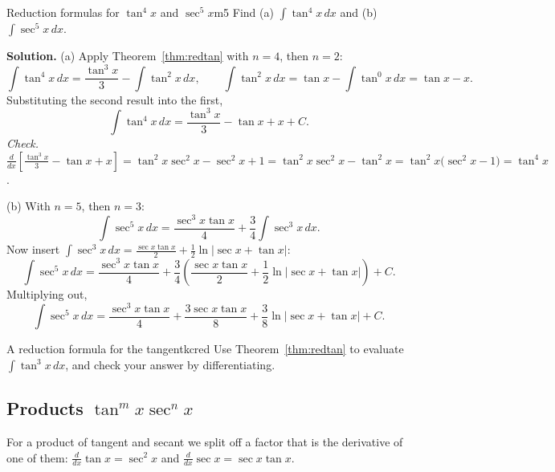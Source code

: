 \documentclass[11pt]{article}
\begin{document}
\begin{exmp}{Reduction formulas for $\tan^4x$ and $\sec^5x$}{m5}
Find (a) $\int\tan^4x\,dx$ and (b) $\int\sec^5x\,dx$.

\textbf{Solution.} (a) Apply Theorem~\ref{thm:redtan} with $n=4$, then $n=2$:
\[\int\tan^4x\,dx=\frac{\tan^3x}3-\int\tan^2x\,dx,\qquad\int\tan^2x\,dx=\tan x-\int\tan^0x\,dx=\tan x-x .\]
Substituting the second result into the first,
\[\int\tan^4x\,dx=\frac{\tan^3x}3-\tan x+x+C .\]
\emph{Check.} $\frac{d}{dx}\left[\frac{\tan^3x}3-\tan x+x\right]=\tan^2x\sec^2x-\sec^2x+1=\tan^2x\sec^2x-\tan^2x=\tan^2x\big(\sec^2x-1\big)=\tan^4x$.

(b) With $n=5$, then $n=3$:
\[\int\sec^5x\,dx=\frac{\sec^3x\tan x}4+\frac34\int\sec^3x\,dx .\]
Now insert $\int\sec^3x\,dx=\frac{\sec x\tan x}2+\frac12\ln\lvert\sec x+\tan x\rvert$:
\[\int\sec^5x\,dx=\frac{\sec^3x\tan x}4+\frac34\left(\frac{\sec x\tan x}2+\frac12\ln\lvert\sec x+\tan x\rvert\right)+C .\]
Multiplying out,
\[\int\sec^5x\,dx=\frac{\sec^3x\tan x}4+\frac{3\sec x\tan x}8+\frac38\ln\lvert\sec x+\tan x\rvert+C .\]
\end{exmp}

\begin{kc}{A reduction formula for the tangent}{kcred}
Use Theorem~\ref{thm:redtan} to evaluate $\int\tan^3x\,dx$, and check your answer by differentiating.
\end{kc}

\subsection*{Products $\tan^mx\sec^nx$}

For a product of tangent and secant we split off a factor that is the derivative of one of them: $\frac{d}{dx}\tan x=\sec^2x$ and $\frac{d}{dx}\sec x=\sec x\tan x$.
\end{document}
